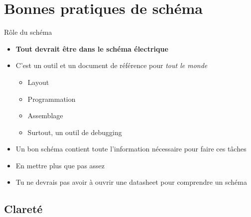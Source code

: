 
\section{Bonnes pratiques de schéma}

\begin{frame}{Rôle du schéma}
    \begin{itemize}
        \item \textbf{Tout devrait être dans le schéma électrique}
        \item C'est un outil et un document de référence pour \textit{tout le monde}
        \begin{itemize}
            \item Layout
            \item Programmation
            \item Assemblage
            \item Surtout, un outil de debugging
        \end{itemize}
        \item Un bon schéma contient toute l'information nécessaire pour faire ces tâches
        \item En mettre plus que pas assez
        \bigskip
        \item Tu ne devrais pas avoir à ouvrir une datasheet pour comprendre un schéma
    \end{itemize}
\end{frame}

\subsection{Clareté}

